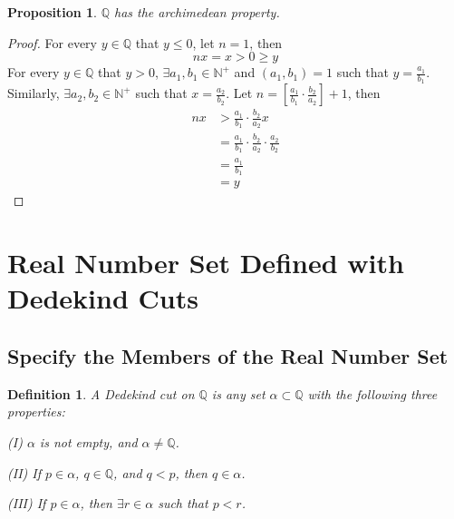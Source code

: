 \documentclass{article}
\newtheorem{definition}{Definition}[section]
\newtheorem{proposition}{Proposition}[section]
\begin{document}
\begin{proposition}
  $\mathbb{Q}$ has the archimedean property.
\end{proposition}
\begin{proof}
  For every $y \in \mathbb{Q}$ that $y \leq 0$, let $n = 1$, then
  \[
    nx = x > 0 \geq y
  \]
  For every $y \in \mathbb{Q}$ that $y > 0$, $\exists a_1, b_1 \in \mathbb{N^+}$ 
  and $(a_1, b_1) = 1$ such that $y = \frac{a_1}{b_1}$. Similarly, 
  $\exists a_2, b_2 \in \mathbb{N^+}$ such that $x = \frac{a_2}{b_2}$. Let 
  $n = [\frac{a_1}{b_1} \cdot \frac{b_2}{a_2}] + 1$, then
  \[
    \begin{split}
      nx &> \frac{a_1}{b_1} \cdot \frac{b_2}{a_2} x \\
         &= \frac{a_1}{b_1} \cdot \frac{b_2}{a_2} \cdot \frac{a_2}{b_2} \\
         &= \frac{a_1}{b_1} \\
         &= y
    \end{split}
  \]
\end{proof}

\section{Real Number Set Defined with Dedekind Cuts}

\subsection{Specify the Members of the Real Number Set}

\begin{definition}
  A Dedekind cut on $\mathbb{Q}$ is any set $\alpha \subset \mathbb{Q}$ with the
  following three properties:
  \begin{description}
    \item{(I)} $\alpha$ is not empty, and $\alpha \neq \mathbb{Q}$.
    \item{(II)} If $p \in \alpha$, $q \in \mathbb{Q}$, and $q < p$, then 
    $q \in \alpha$.
    \item{(III)} If $p \in \alpha$, then $\exists r \in \alpha$ such that $p < r$.
  \end{description}
\end{definition}
\end{document}
